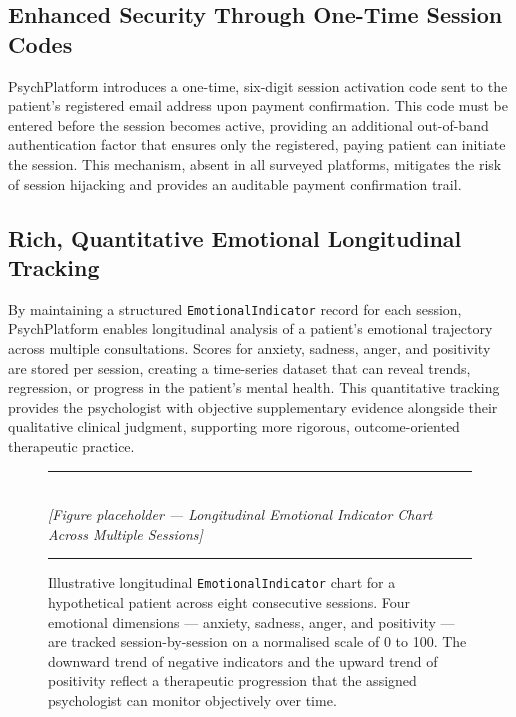 \subsection{Enhanced Security Through One-Time Session Codes}

PsychPlatform introduces a one-time, six-digit session activation code sent to
the patient's registered email address upon payment confirmation. This code must
be entered before the session becomes active, providing an additional out-of-band
authentication factor that ensures only the registered, paying patient can
initiate the session. This mechanism, absent in all surveyed platforms, mitigates
the risk of session hijacking and provides an auditable payment confirmation
trail.

\subsection{Rich, Quantitative Emotional Longitudinal Tracking}

By maintaining a structured \texttt{EmotionalIndicator} record for each session,
PsychPlatform enables longitudinal analysis of a patient's emotional trajectory
across multiple consultations. Scores for anxiety, sadness, anger, and positivity
are stored per session, creating a time-series dataset that can reveal trends,
regression, or progress in the patient's mental health. This quantitative
tracking provides the psychologist with objective supplementary evidence alongside
their qualitative clinical judgment, supporting more rigorous, outcome-oriented
therapeutic practice.

\begin{figure}[H]
  \centering
  \rule{0.85\textwidth}{0.4pt}\\[6pt]
  {\small\itshape [Figure placeholder — Longitudinal Emotional Indicator Chart Across Multiple Sessions]}
  \rule{0.85\textwidth}{0.4pt}
  \caption{Illustrative longitudinal \texttt{EmotionalIndicator} chart for a
           hypothetical patient across eight consecutive sessions. Four emotional
           dimensions — anxiety, sadness, anger, and positivity — are tracked
           session-by-session on a normalised scale of 0 to 100. The downward
           trend of negative indicators and the upward trend of positivity reflect
           a therapeutic progression that the assigned psychologist can monitor
           objectively over time.}
  \label{fig:longitudinal-chart}
\end{figure}

